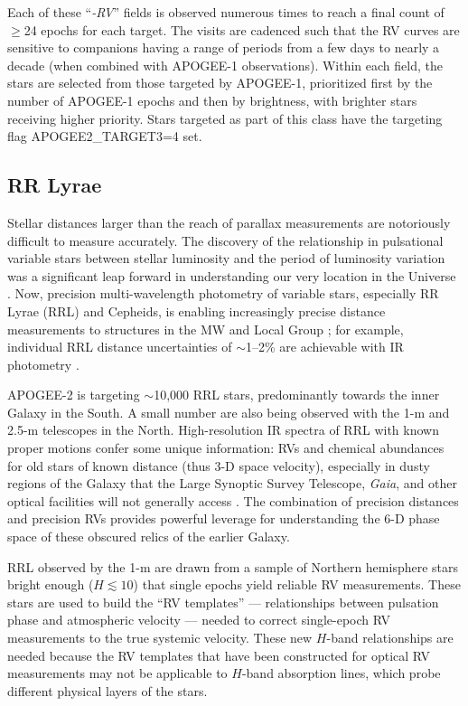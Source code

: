 \documentclass[12pt,twocolumn]{emulateapj}
\begin{document}
Each of these ``{\it -RV}'' fields is observed numerous times to reach a final count of $\geq$24 epochs for each target.  The visits are cadenced such that the RV curves are sensitive to companions having a range of periods from a few days to nearly a decade (when combined with APOGEE-1 observations).  Within each field, the stars are selected from those targeted by APOGEE-1, prioritized first by the number of APOGEE-1 epochs and then by brightness, with brighter stars receiving higher priority.  Stars targeted as part of this class have the targeting flag APOGEE2\_TARGET3=4 set.


\subsection{RR Lyrae}
\label{sec:rrl}

Stellar distances larger than the reach of parallax measurements are notoriously difficult to measure accurately.  The discovery of the relationship in pulsational variable stars between stellar luminosity and the period of luminosity variation was a significant leap forward in understanding our very location in the Universe \citep[e.g.,][]{Leavitt_1912_cepheids}.  Now, precision multi-wavelength photometry of variable stars, especially RR Lyrae (RRL) and Cepheids, is enabling increasingly precise distance measurements to structures in the MW and Local Group \citep[e.g.,][]{Dekany_2013_bulgeRRL}; for example, individual RRL distance uncertainties of $\sim$1--2\%  are achievable with IR photometry \citep[e.g.,][]{Klein_2014_MIRLeavittLawWISE,Scowcroft_2015_CRRP,Beaton_2016_CCHP}.

APOGEE-2 is targeting $\sim$10,000 RRL stars, predominantly towards the inner Galaxy in the South.  A small number are also being observed with the 1-m and 2.5-m telescopes in the North.  High-resolution IR spectra of RRL with known proper motions confer some unique information: RVs and chemical abundances for old stars of known distance (thus 3-D space velocity), especially in dusty regions of the Galaxy that the Large Synoptic Survey Telescope, {\it Gaia}, and other optical facilities will not generally access \citep{Ivezic_2008_lsst,GaiaCollab_2016_gaia}.   The combination of precision distances and precision RVs provides powerful leverage for understanding the 6-D phase space of these obscured relics of the earlier Galaxy.

RRL observed by the 1-m are drawn from a sample of Northern hemisphere stars bright enough ($H \lesssim 10$) that single epochs yield reliable RV measurements.  These stars are used to build the ``RV templates'' --- relationships between pulsation phase and atmospheric velocity --- 
needed to correct single-epoch RV measurements to the true systemic velocity.  These new $H$-band relationships are needed because the RV templates that have been constructed for optical RV measurements \citep[e.g.,][]{Liu_1991_RRLRVtemplates,Sesar_2012_RRLRVtemplates} may not be applicable to $H$-band absorption lines, which probe different physical layers of the stars.
\end{document}
